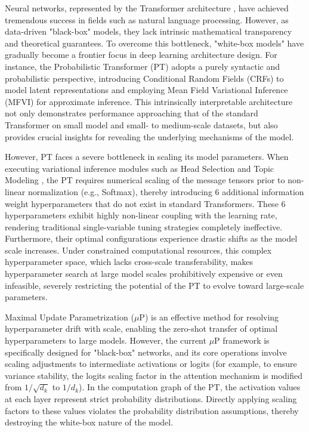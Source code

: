 \documentclass[11pt]{article}
\begin{document}
Neural networks, represented by the Transformer architecture \cite{vaswani2017attention}, have achieved tremendous success in fields such as natural language processing. However, as data-driven "black-box" models, they lack intrinsic mathematical transparency and theoretical guarantees. To overcome this bottleneck, "white-box models" have gradually become a frontier focus in deep learning architecture design. For instance, the Probabilistic Transformer (PT) \cite{wu2023probabilistic} adopts a purely syntactic and probabilistic perspective, introducing Conditional Random Fields (CRFs) \cite{lafferty2001conditional} to model latent representations and employing Mean Field Variational Inference (MFVI) \cite{blei2017variational} for approximate inference. This intrinsically interpretable architecture not only demonstrates performance approaching that of the standard Transformer on small model and small- to medium-scale datasets, but also provides crucial insights for revealing the underlying mechanisms of the model.

However, PT faces a severe bottleneck in scaling its model parameters. When executing variational inference modules such as Head Selection and Topic Modeling \cite{blei2003latent}, the PT requires numerical scaling of the message tensors prior to non-linear normalization (e.g., Softmax), thereby introducing 6 additional information weight hyperparameters that do not exist in standard Transformers. These 6 hyperparameters exhibit highly non-linear coupling with the learning rate, rendering traditional single-variable tuning strategies completely ineffective. Furthermore, their optimal configurations experience drastic shifts as the model scale increases. Under constrained computational resources, this complex hyperparameter space, which lacks cross-scale transferability, makes hyperparameter search at large model scales prohibitively expensive or even infeasible, severely restricting the potential of the PT to evolve toward large-scale parameters.

Maximal Update Parametrization ($\mu$P) \cite{yang2022tensor} is an effective method for resolving hyperparameter drift with scale, enabling the zero-shot transfer of optimal hyperparameters to large models. However, the current $\mu$P framework is specifically designed for "black-box" networks, and its core operations involve scaling adjustments to intermediate activations or logits (for example, to ensure variance stability, the logits scaling factor in the attention mechanism is modified from $1/\sqrt{d_k}$ to $1/d_k$). In the computation graph of the PT, the activation values at each layer represent strict probability distributions. Directly applying scaling factors to these values violates the probability distribution assumptions, thereby destroying the white-box nature of the model.
\end{document}
